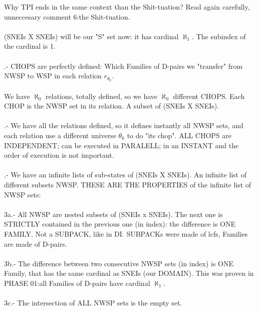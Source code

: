 		\noindent
		Why TPI ends in the same context than the Shit-tuation? Read again carefully, unneccesary comment 6:the Shit-tuation.
		\\\\
		
		\noindent
		(SNEIs X SNEIs) will be our "S" set now: it has cardinal $\aleph_{1}$. The subindex of the cardinal is 1.
		\\\\
		
		.- CHOPS are perfectly defined: Which Families of D-pairs we "transfer" from NWSP to WSP in each relation $r_{\theta_{k}}$.
		\\\\
		
		\noindent
		We have $\aleph_{0}$ relations, totally defined, so we have $\aleph_{0}$ different CHOPS. Each CHOP is the NWSP set in its relation. A subset of (SNEIs X SNEIs).
		\\\\
		
		.- We have all the relations defined, so it defines instantly all NWSP sets, and each relation use a different universe $\theta_{k}$ to do "its chop". ALL CHOPS are INDEPENDENT; can be executed in PARALELL; in an INSTANT and the order of execution is not important.
		\\\\
		
		.- We have an infinite lists of sub-states of (SNEIs X SNEIs). An infinite list of different subsets NWSP. THESE ARE THE PROPERTIES of the infinite list of NWSP sets:
		\\\\
		
		\noindent
		3a.- All NWSP are nested subsets of (SNEIs x SNEIs). The next one is STRICTLY contained in the previous one (in index): the difference is ONE FAMILY. Not a SUBPACK, like in DI. SUBPACKs were made of lcfs, Families are made of D-pairs. 
		\\\\
		
		\noindent
		3b.- The difference between two consecutive NWSP sets (in index) is ONE Family, that has the same cardinal as SNEIs (our DOMAIN). This was proven in PHASE 01:all Families of D-pairs have cardinal $\aleph_{1}$.
		\\\\
		
		\noindent
		3c.- The intersection of ALL NWSP sets is the empty set.
		\\\\
		
